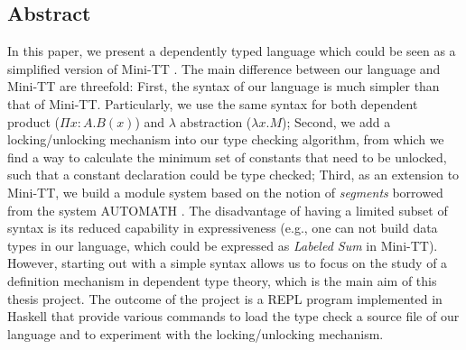 \documentclass{article}
\theoremstyle{remark}
\begin{document}
\subsection{Abstract}
In this paper, we present a dependently typed language which could be seen as a simplified version of Mini-TT \cite{coquand2009simple}. The main difference between our language and Mini-TT are threefold: First, the syntax of our language is much simpler than that of Mini-TT. Particularly, we use the same syntax for both dependent product ($\Pi x:A.B(x)$) and $\lambda$ abstraction ($\lambda x . M$); Second, we add a locking/unlocking mechanism into our type checking algorithm, from which we find a way to calculate the minimum set of constants that need to be unlocked, such that a constant declaration could be type checked; Third, as an extension to Mini-TT, we build a module system based on the notion of \emph{segments} borrowed from the system AUTOMATH \cite{de1994survey}. The disadvantage of having a limited subset of syntax is its reduced capability in expressiveness (e.g., one can not build data types in our language, which could be expressed as \emph{Labeled Sum} in Mini-TT). However, starting out with a simple syntax allows us to focus on the study of a definition mechanism in dependent type theory, which is the main aim of this thesis project. The outcome of the project is a REPL program implemented in Haskell that provide various commands to load the type check a source file of our language and to experiment with the locking/unlocking mechanism.
\end{document}
